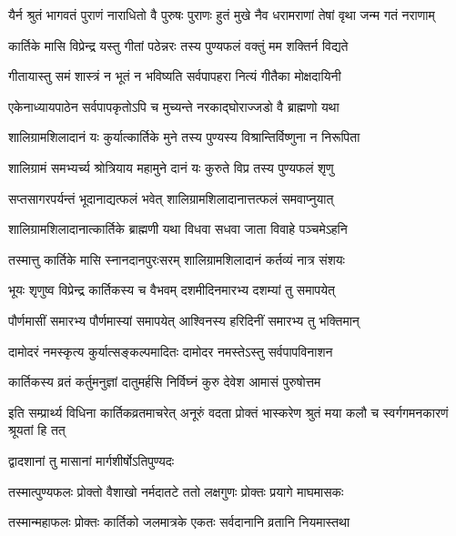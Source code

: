 \twolineshloka
{यैर्न श्रुतं भागवतं पुराणं नाराधितो वै पुरुषः पुराणः}
{हुतं मुखे नैव धरामराणां तेषां वृथा जन्म गतं नराणाम्} %

\twolineshloka
{कार्तिके मासि विप्रेन्द्र यस्तु गीतां पठेन्नरः}
{तस्य पुण्यफलं वक्तुं मम शक्तिर्न विद्यते} %

\twolineshloka
{गीतायास्तु समं शास्त्रं न भूतं न भविष्यति}
{सर्वपापहरा नित्यं गीतैका मोक्षदायिनी} %

\twolineshloka
{एकेनाध्यायपाठेन सर्वपापकृतोऽपि च}
{मुच्यन्ते नरकाद्घोराज्जडो वै ब्राह्मणो यथा} %

\twolineshloka
{शालिग्रामशिलादानं यः कुर्यात्कार्तिके मुने}
{तस्य पुण्यस्य विश्रान्तिर्विष्णुना न निरूपिता} %

\twolineshloka
{शालिग्रामं समभ्यर्च्य श्रोत्रियाय महामुने}
{दानं यः कुरुते विप्र तस्य पुण्यफलं शृणु} %

\twolineshloka
{सप्तसागरपर्यन्तं भूदानाद्यत्फलं भवेत्}
{शालिग्रामशिलादानात्तत्फलं समवाप्नुयात्} %

\twolineshloka
{शालिग्रामशिलादानात्कार्तिके ब्राह्मणी यथा}
{विधवा सधवा जाता विवाहे पञ्चमेऽहनि} %

\twolineshloka
{तस्मात्तु कार्तिके मासि स्नानदानपुरःसरम्}
{शालिग्रामशिलादानं कर्तव्यं नात्र संशयः} %





\twolineshloka
{भूयः शृणुष्व विप्रेन्द्र कार्तिकस्य च वैभवम्}
{दशमीदिनमारभ्य दशम्यां तु समापयेत्} %

\twolineshloka
{पौर्णमासीं समारभ्य पौर्णमास्यां समापयेत्}
{आश्विनस्य हरिदिनीं समारभ्य तु भक्तिमान्} %

\twolineshloka
{दामोदरं नमस्कृत्य कुर्यात्सङ्कल्पमादितः}
{दामोदर नमस्तेऽस्तु सर्वपापविनाशन} %

\twolineshloka
{कार्तिकस्य व्रतं कर्तुमनुज्ञां दातुमर्हसि}
{निर्विघ्नं कुरु देवेश आमासं पुरुषोत्तम} %

\threelineshloka
{इति सम्प्रार्थ्य विधिना कार्तिकव्रतमाचरेत्}
{अनूरुं वदता प्रोक्तं भास्करेण श्रुतं मया}
{कलौ च स्वर्गगमनकारणं श्रूयतां हि तत्} %



\onelineshloka
{द्वादशानां तु मासानां मार्गशीर्षोऽतिपुण्यदः} %

\twolineshloka
{तस्मात्पुण्यफलः प्रोक्तो वैशाखो नर्मदातटे}
{ततो लक्षगुणः प्रोक्तः प्रयागे माघमासकः} %

\twolineshloka
{तस्मान्महाफलः प्रोक्तः कार्तिको जलमात्रके}
{एकतः सर्वदानानि व्रतानि नियमास्तथा} %

